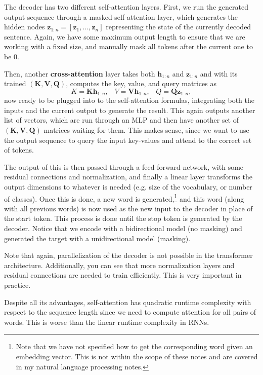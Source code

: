 \documentclass{article}
\begin{document}
    The decoder has two different self-attention layers. First, we run the generated output sequence through a masked self-attention layer, which generates the hidden nodes $\mathbf{z}_{1:n} = [\mathbf{z}_1, \ldots, \mathbf{z}_n]$ representing the state of the currently decoded sentence. Again, we have some maximum output length to ensure that we are working with a fixed size, and manually mask all tokens after the current one to be $0$.

    Then, another \textbf{cross-attention} layer takes both $\mathbf{h}_{1:n}$ and $\mathbf{z}_{1:n}$ and with its trained $(\mathbf{K}, \mathbf{V}, \mathbf{Q})$, computes the key, value, and query matrices as 
    \begin{equation}
      K = \mathbf{K} \mathbf{h}_{1:n}, \;\;\; V = \mathbf{V} \mathbf{h}_{1:n}, \;\;\; Q = \mathbf{Q} \mathbf{z}_{1:n}, 
    \end{equation}
    now ready to be plugged into to the self-attention formulas, integrating both the inputs and the current output to generate the result. This again outputs another list of vectors, which are run through an MLP and then have another set of $(\mathbf{K}, \mathbf{V}, \mathbf{Q})$ matrices waiting for them. This makes sense, since we want to use the output sequence to query the input key-values and attend to the correct set of tokens. 
    
    The output of this is then passed through a feed forward network, with some residual connections and normalization, and finally a linear layer transforms the output dimensions to whatever is needed (e.g. size of the vocabulary, or number of classes). Once this is done, a new word is generated,\footnote{Note that we have not specified how to get the corresponding word given an embedding vector. This is not within the scope of these notes and are covered in my natural language processing notes.} and this word (along with all previous words) is now used as the new input to the decoder in place of the start token. This process is done until the stop token is generated by the decoder. Notice that we encode with a bidirectional model (no masking) and generated the target with a unidirectional model (masking). 

    Note that again, parallelization of the decoder is not possible in the transformer architecture. Additionally, you can see that more normalization layers and residual connections are needed to train efficiently. This is very important in practice. 

    Despite all its advantages, self-attention has quadratic runtime complexity with respect to the sequence length since we need to compute attention for all pairs of words. This is worse than the linear runtime complexity in RNNs.  
\end{document}
